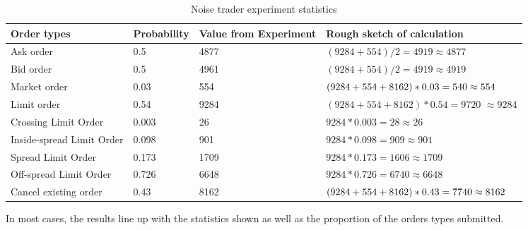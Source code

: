 \begin{table}[h]
\centering
\begin{tabular}{ |l||l|l|p{4cm}|} 
\hline
\textbf{Order types} & \textbf{Probability} & \textbf{Value from Experiment} & \textbf{Rough sketch of calculation} \\
\hline
\hline
Ask order & 0.5 & 4877 & $(9284 + 554) / 2 = 4919 \approx 4877$\\ 
\hline
Bid order & 0.5 & 4961 & $(9284 + 554) / 2 = 4919 \approx 4919$\\ 
\hline
\hline
Market order & 0.03 & 554 & $(9284 + 554 + 8162) * 0.03 = 540 \newline \approx 554$\\ 
\hline
\hline
Limit order & 0.54 & 9284 & $(9284 + 554 + 8162) * 0.54 = 9720$  
\newline $\approx 9284 $\\ 
\hline
Crossing Limit Order & 0.003 & 26 & $9284 * 0.003 = 28 \approx 26 $\\ 
\hline
Inside-spread Limit Order & 0.098 & 901 & $9284 * 0.098 = 909 \approx 901 $\\ 
\hline
Spread Limit Order & 0.173 & 1709 & $9284 * 0.173 = 1606 \approx 1709 $\\ 
\hline
Off-spread Limit Order & 0.726 & 6648 & $9284 * 0.726 = 6740 \approx 6648 $\\ 
\hline
\hline
Cancel existing order & 0.43 & 8162 & $(9284 + 554 + 8162) * 0.43 = 7740 \newline \approx 8162 $\\ 
\hline
\end{tabular}
\caption{Noise trader experiment statistics} 
\end{table}
\FloatBarrier 

In most cases, the results line up with the statistics shown as well as the proportion of the orders types submitted.